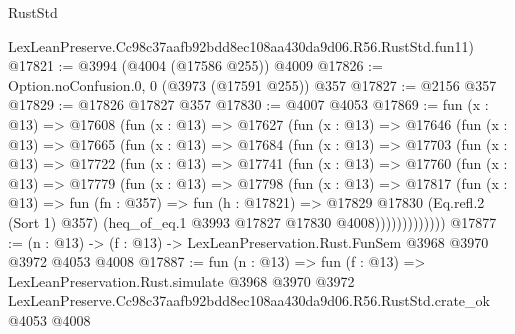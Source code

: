 \begin{lexlean}{RustStd}
\begin{coremodule}
    LexLeanPreserve.Cc98c37aafb92bdd8ec108aa430da9d06.R56.RustStd.fun11)
@17821 := @3994 (@4004 (@17586 @255)) @4009
@17826 := Option.noConfusion.{0, 0} (@3973 (@17591 @255)) @357
@17827 := @2156 @357
@17829 := @17826 @17827 @357
@17830 := @4007 @4053
@17869 := fun (x : @13) =>
  @17608
    (fun (x : @13) =>
    @17627
      (fun (x : @13) =>
      @17646
        (fun (x : @13) =>
        @17665
          (fun (x : @13) =>
          @17684
            (fun (x : @13) =>
            @17703
              (fun (x : @13) =>
              @17722
                (fun (x : @13) =>
                @17741
                  (fun (x : @13) =>
                  @17760
                    (fun (x : @13) =>
                    @17779
                      (fun (x : @13) =>
                      @17798
                        (fun (x : @13) =>
                        @17817
                          (fun (x : @13) =>
                          fun (fn : @357) =>
                          fun (h : @17821) =>
                          @17829
                            @17830
                            (Eq.refl.{2} (Sort 1) @357)
                            (heq_of_eq.{1} @3993 @17827 @17830 @4008)))))))))))))
@17877 := (n : @13) -> (f : @13) -> LexLeanPreservation.Rust.FunSem @3968 @3970 @3972 @4053 @4008
@17887 := fun (n : @13) =>
  fun (f : @13) =>
  LexLeanPreservation.Rust.simulate
    @3968
    @3970
    @3972
    LexLeanPreserve.Cc98c37aafb92bdd8ec108aa430da9d06.R56.RustStd.crate_ok
    @4053
    @4008
\end{coremodule}
\end{lexlean}
